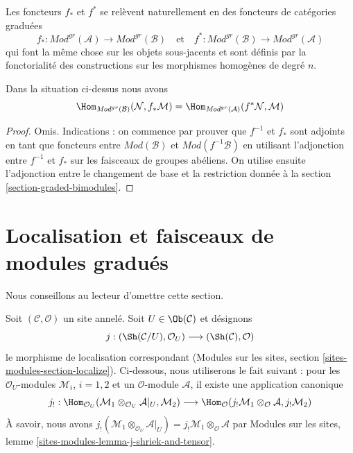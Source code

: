 \medskip\noindent
Les foncteurs $f_*$ et $f^*$ se relèvent naturellement en des
foncteurs de catégories graduées
$$
f_*
: \textit{Mod}^{gr}(\mathcal{A})
\longrightarrow
\textit{Mod}^{gr}(\mathcal{B})
\quad\text{et}\quad
f^* :
\textit{Mod}^{gr}(\mathcal{B})
\longrightarrow
\textit{Mod}^{gr}(\mathcal{A})
$$
qui font la même chose sur les objets sous-jacents et sont définis
par la fonctorialité des constructions sur les morphismes homogènes
de degré $n$.

\begin{lemma}
\label{lemma-adjunction-push-pull-gr} Dans
la situation ci-dessus nous
avons $$
\Hom_{\textit{Mod}^{gr}(\mathcal{B})}(
\mathcal{N}, f_*\mathcal{M})
= \Hom_{\textit{Mod}^{gr}(\mathcal{A})}(
f^*\mathcal{N}, \mathcal{M})
$$
\end{lemma}

\begin{proof}
Omis. Indications : on commence par prouver que $f^{-1}$ et $f_*$ sont adjoints
en tant que foncteurs entre $\textit{Mod}(\mathcal{B})$
et $\textit{Mod}(f^{-1}\mathcal{B})$ en utilisant l'adjonction entre
$f^{-1}$ et $f_*$ sur les faisceaux de groupes abéliens.
On utilise ensuite l'adjonction entre le changement de base et la restriction
donnée à la section \ref{section-graded-bimodules}.
\end{proof}





\section{Localisation et faisceaux de modules gradués}
\label{section-localize-graded}

\noindent
Nous conseillons au lecteur d'omettre cette section.

\medskip\noindent
Soit $(\mathcal{C}, \mathcal{O})$ un site annelé. Soit
$U \in \Ob(\mathcal{C})$ et désignons
$$ j
:
(\Sh(\mathcal{C}/U), \mathcal{O}_U)
\longrightarrow
(\Sh(\mathcal{C}), \mathcal{O})
$$ le
morphisme de localisation correspondant (Modules
sur les sites, section \ref{sites-modules-section-localize}).
Ci-dessous, nous utiliserons le fait suivant : pour les $\mathcal{O}_U$-modules
$\mathcal{M}_i$, $i = 1, 2$ et un $\mathcal{O}$-module $\mathcal{A}$,
il existe une application
canonique $$
j_!
: \Hom_{\mathcal{O}_U}(
\mathcal{M}_1 \otimes_{\mathcal{O}_U} \mathcal{A}|_U, \mathcal{M}_2)
\longrightarrow
\Hom_\mathcal{O}(
j_!\mathcal{M}_1 \otimes_\mathcal{O} \mathcal{A}, j_!\mathcal{M}_2)
$$
À savoir, nous
avons $j_!(\mathcal{M}_1 \otimes_{\mathcal{O}_U} \mathcal{A}|_U)
= j_!\mathcal{M}_1 \otimes_\mathcal{O} \mathcal{A}$ par
Modules sur les sites, lemme \ref{sites-modules-lemma-j-shriek-and-tensor}.

